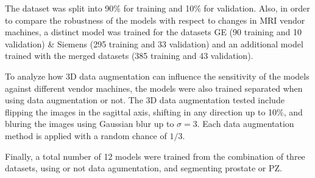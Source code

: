 The dataset was split into 90\% for training and 10\% for
validation. Also, in order to compare the robustness of the models with respect to changes
in MRI vendor machines,  a distinct model was trained for the datasets GE (90
training and 10 validation) \& Siemens (295 training and 33 validation) and 
an additional model trained with the merged datasets (385 training and 43 validation). 

To analyze how 3D data augmentation can influence the sensitivity of the models
against different vendor machines, the models were also trained separated when
using data augmentation or not. The 3D data augmentation tested include flipping the
images in the sagittal axis,  shifting in any direction up to 10\%, and
bluring the images using Gaussian blur up to $\sigma = 3$. Each data augmentation
method is applied with a random chance of $1/3$.

Finally, a total number of 12 models were trained from the combination of 
three datasets, using or not data agumentation, and segmenting prostate or PZ. 
